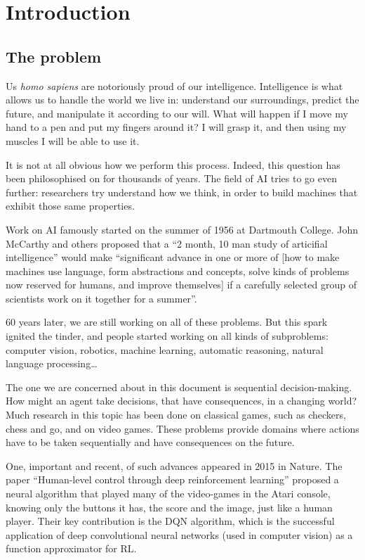 \chapter{Introduction}
\section{The problem}
Us \emph{homo sapiens} are notoriously proud of our intelligence. Intelligence
is what allows us to handle the world we live in: understand our surroundings,
predict the future, and manipulate it according to our will. What will happen
if I move my hand to a pen and put my fingers around it? I will grasp it, and
then using my muscles I will be able to use it.

It is not at all obvious how we perform this process. Indeed, this question
has been philosophised on for thousands of years. The field of \ac{AI} tries
to go even further: researchers try understand how we think, in order to build
machines that exhibit those same properties.

Work on \ac{AI} famously started on the summer of 1956 at Dartmouth College.
John McCarthy and others proposed that a ``2 month, 10 man study of articifial
intelligence'' would make ``significant advance in one or more of [how to make
machines use language, form abstractions and concepts, solve kinds of problems
now reserved for humans, and improve themselves] if a carefully selected group
of scientists work on it together for a summer''. \citep[Section~1.3]{russell2009aima}

60 years later, we are still working on all of these problems. But this spark
ignited the tinder, and people started working on all kinds of subproblems:
computer vision, robotics, machine learning, automatic reasoning, natural
language processing\dots

The one we are concerned about in this document is sequential decision-making.
How might an agent take decisions, that have consequences, in a changing world?
Much research in this topic has been done on classical games, such as checkers,
chess and go, and on video games. These problems provide domains where actions
have to be taken sequentially and have consequences on the future.

One, important and recent, of such advances appeared in 2015 in Nature. The
paper ``Human-level control through deep reinforcement learning''
\citep{mnih2015human} proposed a neural algorithm that played many of the
video-games in the Atari console, knowing only the buttons it has, the score and
the image, just like a human player. Their key contribution is the \ac{DQN}
algorithm, which is the successful application of deep convolutional neural
networks (used in computer vision) as a function approximator for \ac{RL}.

